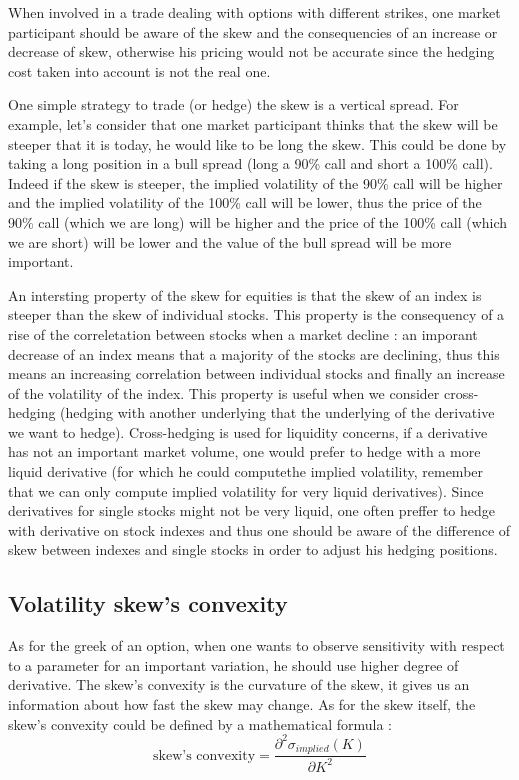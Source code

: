 \documentclass[hidelinks]{article}
\theoremstyle{definition}
\begin{document}
    When involved in a trade dealing with options with different strikes, one market participant should be aware of the skew and the consequencies of an increase or decrease of skew, otherwise his pricing would not be accurate since the hedging cost taken into account is not the real one.
    
    One simple strategy to trade (or hedge) the skew is a vertical spread. For example, let's consider that one market participant thinks that the skew will be steeper that it is today, he would like to be long the skew. This could be done by taking a long position in a bull spread (long a 90\% call and short a 100\% call). Indeed if the skew is steeper, the implied volatility of the 90\% call will be higher and the implied volatility of the 100\% call will be lower, thus the price of the 90\% call (which we are long) will be higher and the price of the 100\% call (which we are short) will be lower and the value of the bull spread will be more important.
    
    An intersting property of the skew for equities is that the skew of an index is steeper than the skew of individual stocks. This property is the consequency of a rise of the correletation between stocks when a market decline : an imporant decrease of an index means that a majority of the stocks are declining, thus this means an increasing correlation between individual stocks and finally an increase of the volatility of the index. This property is useful when we consider cross-hedging (hedging with another underlying that the underlying of the derivative we want to hedge). Cross-hedging is used for liquidity concerns, if a derivative has not an important market volume, one would prefer to hedge with a more liquid derivative (for which he could computethe implied volatility, remember that we can only compute implied volatility for very liquid derivatives). Since derivatives for single stocks might not be very liquid, one often preffer to hedge with derivative on stock indexes and thus one should be aware of the difference of skew between indexes and single stocks in order to adjust his hedging positions.
    
    
   \newpage
   \subsection{Volatility skew's convexity}
   As for the greek of an option, when one wants to observe sensitivity with respect to a parameter for an important variation, he should use higher degree of derivative. The skew's convexity is the curvature of the skew, it gives us an information about how fast the skew may change. As for the skew itself, the skew's convexity could be defined by a mathematical formula :
   $$\text{skew's convexity} = \frac{\partial^2 \sigma_{implied}(K)}{\partial K^2}$$
   
\end{document}
